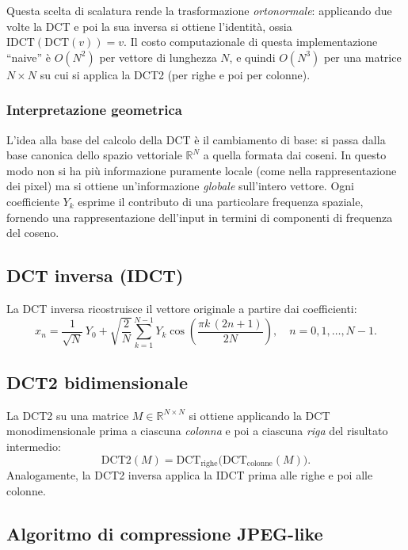 \documentclass[12pt,a4paper]{article}
\newcommand{\R}{\mathbb{R}}
\begin{document}
Questa scelta di scalatura rende la trasformazione \emph{ortonormale}:
applicando due volte la DCT e poi la sua inversa si ottiene l'identità, ossia
$\text{IDCT}(\text{DCT}(v)) = v$.
Il costo computazionale di questa implementazione ``naive'' è $O(N^2)$ per
vettore di lunghezza $N$, e quindi $O(N^3)$ per una matrice $N\times N$ su cui
si applica la DCT2 (per righe e poi per colonne).

\subsubsection{Interpretazione geometrica}
\label{sec:interpretazione}
L'idea alla base del calcolo della DCT è il cambiamento di base: si passa dalla
base canonica dello spazio vettoriale $\R^N$ a quella formata dai coseni.
In questo modo non si ha più informazione puramente locale (come nella
rappresentazione dei pixel) ma si ottiene un'informazione \emph{globale}
sull'intero vettore. Ogni coefficiente $Y_k$ esprime il contributo di una
particolare frequenza spaziale, fornendo una rappresentazione dell'input in
termini di componenti di frequenza del coseno.

\subsection{DCT inversa (IDCT)}

La DCT inversa ricostruisce il vettore originale a partire dai coefficienti:
\begin{equation}
  x_n = \frac{1}{\sqrt{N}}\,Y_0
        + \sqrt{\frac{2}{N}}\sum_{k=1}^{N-1} Y_k
          \cos\!\left(\frac{\pi k\,(2n+1)}{2N}\right),
  \quad n = 0, 1, \ldots, N-1.
  \label{eq:idct}
\end{equation}

\subsection{DCT2 bidimensionale}

La DCT2 su una matrice $M \in \R^{N\times N}$ si ottiene applicando la DCT
monodimensionale prima a ciascuna \emph{colonna} e poi a ciascuna \emph{riga}
del risultato intermedio:
\begin{equation}
  \text{DCT2}(M) = \text{DCT}_{\text{righe}}\!\bigl(\text{DCT}_{\text{colonne}}(M)\bigr).
\end{equation}
Analogamente, la DCT2 inversa applica la IDCT prima alle righe e poi alle colonne.

\subsection{Algoritmo di compressione JPEG-like}
\end{document}

